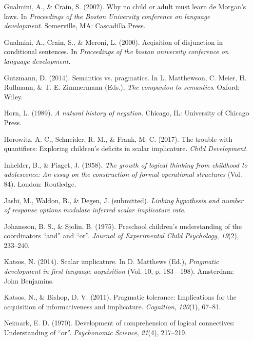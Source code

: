 \documentclass[floatsintext,man]{apa6}
\theoremstyle{definition}
\theoremstyle{definition}
\theoremstyle{definition}
\theoremstyle{remark}
\begin{document}
\hypertarget{ref-gualminicrain2002}{}
Gualmini, A., \& Crain, S. (2002). Why no child or adult must learn de
Morgan's laws. In \emph{Proceedings of the Boston University conference
on language development}. Somerville, MA: Cascadilla Press.

\hypertarget{ref-gualmini2000}{}
Gualmini, A., Crain, S., \& Meroni, L. (2000). Acqisition of disjunction
in conditional sentences. In \emph{Proceedings of the boston university
conference on language development}.

\hypertarget{ref-gutzmann2014}{}
Gutzmann, D. (2014). Semantics vs. pragmatics. In L. Matthewson, C.
Meier, H. Rullmann, \& T. E. Zimmermann (Eds.), \emph{The companion to
semantics}. Oxford: Wiley.

\hypertarget{ref-horn1989natural}{}
Horn, L. (1989). \emph{A natural history of negation}. Chicago, IL:
University of Chicago Press.

\hypertarget{ref-horowitz2017trouble}{}
Horowitz, A. C., Schneider, R. M., \& Frank, M. C. (2017). The trouble
with quantifiers: Exploring children's deficits in scalar implicature.
\emph{Child Development}.

\hypertarget{ref-piaget1958growth}{}
Inhelder, B., \& Piaget, J. (1958). \emph{The growth of logical thinking
from childhood to adolescence: An essay on the construction of formal
operational structures} (Vol. 84). London: Routledge.

\hypertarget{ref-jasbiWaldonDegan2017}{}
Jasbi, M., Waldon, B., \& Degen, J. (submitted). \emph{Linking
hypothesis and number of response options modulate inferred scalar
implicature rate}.

\hypertarget{ref-johansson1975preschool}{}
Johansson, B. S., \& Sjolin, B. (1975). Preschool children's
understanding of the coordinators ``and'' and ``or''. \emph{Journal of
Experimental Child Psychology}, \emph{19}(2), 233--240.

\hypertarget{ref-katsos2014scalar}{}
Katsos, N. (2014). Scalar implicature. In D. Matthews (Ed.),
\emph{Pragmatic development in first language acquisition} (Vol. 10, p.
183---198). Amsterdam: John Benjamins.

\hypertarget{ref-katsos2011pragmatic}{}
Katsos, N., \& Bishop, D. V. (2011). Pragmatic tolerance: Implications
for the acquisition of informativeness and implicature.
\emph{Cognition}, \emph{120}(1), 67--81.

\hypertarget{ref-neimark1970}{}
Neimark, E. D. (1970). Development of comprehension of logical
connectives: Understanding of ``or''. \emph{Psychonomic Science},
\emph{21}(4), 217--219.
\end{document}
